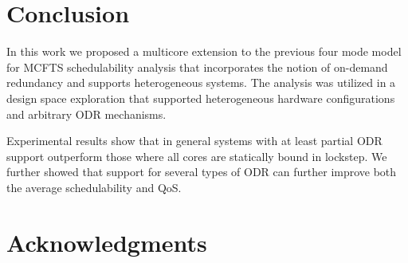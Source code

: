 \documentclass[conference]{IEEEtran}
\begin{document}
\section{Conclusion}
\label{sec:conclusion}

In this work we proposed a multicore extension to the previous four mode model for MCFTS schedulability analysis that incorporates the notion of on-demand redundancy and supports heterogeneous systems. The analysis was utilized in a design space exploration that supported heterogeneous hardware configurations and arbitrary ODR mechanisms. 

Experimental results show that in general systems with at least partial ODR support outperform those where all cores are statically bound in lockstep. We further showed that support for several types of ODR can further improve both the average schedulability and QoS.

\section*{Acknowledgments}



\end{document}

